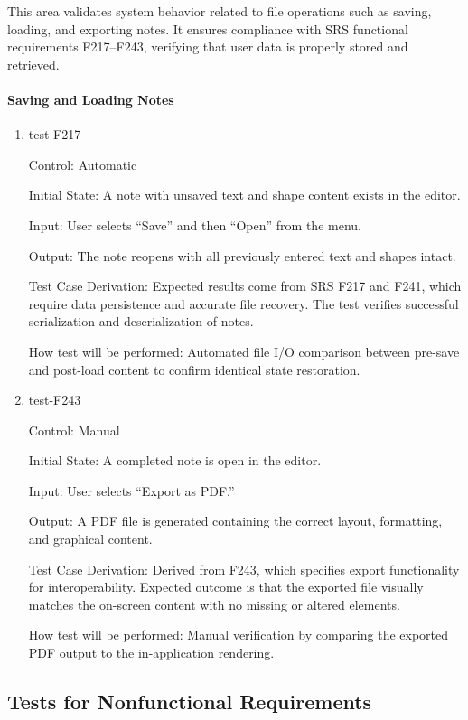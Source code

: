 \documentclass[12pt, titlepage]{article}
\begin{document}
This area validates system behavior related to file operations such as saving, loading, and exporting notes.
It ensures compliance with SRS functional requirements F217–F243, verifying that user data is properly stored and retrieved.

\paragraph{Saving and Loading Notes}

\begin{enumerate}

\item{test-F217\\}

Control: Automatic

Initial State: A note with unsaved text and shape content exists in the editor.

Input: User selects “Save” and then “Open” from the menu.

Output: The note reopens with all previously entered text and shapes intact.

Test Case Derivation: Expected results come from SRS F217 and F241, which require data persistence and accurate file recovery.
The test verifies successful serialization and deserialization of notes.

How test will be performed: Automated file I/O comparison between pre-save and post-load content to confirm identical state restoration.

\item{test-F243\\}

Control: Manual

Initial State: A completed note is open in the editor.

Input: User selects “Export as PDF.”

Output: A PDF file is generated containing the correct layout, formatting, and graphical content.

Test Case Derivation: Derived from F243, which specifies export functionality for interoperability.
Expected outcome is that the exported file visually matches the on-screen content with no missing or altered elements.

How test will be performed: Manual verification by comparing the exported PDF output to the in-application rendering.

\end{enumerate}

\subsection{Tests for Nonfunctional Requirements}
\end{document}
